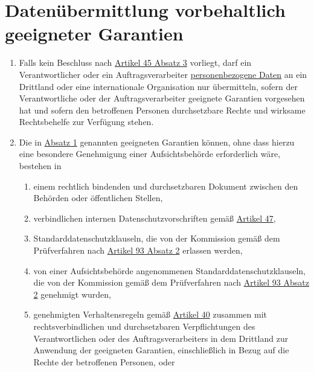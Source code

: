 \chapter{Datenübermittlung vorbehaltlich geeigneter Garantien}
\label{ch:46}


\begin{enumerate}

  \item Falls kein Beschluss nach \hyperref[itm:45-3]{Artikel 45 Absatz 3} vorliegt, darf ein Verantwortlicher oder ein
   Auftragsverarbeiter \hyperref[itm:04-1]{personenbezogene Daten} an ein Drittland oder eine internationale Organisation nur übermitteln,
   sofern der Verantwortliche oder der Auftragsverarbeiter geeignete Garantien vorgesehen hat und sofern den
   betroffenen Personen durchsetzbare Rechte und wirksame Rechtsbehelfe zur Verfügung stehen.
  \label{itm:46-1}

  \item Die in \hyperref[itm:46-1]{Absatz 1} genannten geeigneten Garantien können, ohne dass hierzu eine besondere
   Genehmigung einer Aufsichtsbehörde erforderlich wäre, bestehen in
  \label{itm:46-2}

  \begin{enumerate}
  
    \item einem rechtlich bindenden und durchsetzbaren Dokument zwischen den Behörden oder öffentlichen Stellen,
    \label{itm:46-2a}

    \item verbindlichen internen Datenschutzvorschriften gemäß \hyperref[ch:47]{Artikel 47},
    \label{itm:46-2b}

    \item Standarddatenschutzklauseln, die von der Kommission gemäß dem Prüfverfahren nach \hyperref[itm:93-2]
     {Artikel 93 Absatz 2} erlassen werden,
    \label{itm:46-2c}

    \item von einer Aufsichtsbehörde angenommenen Standarddatenschutzklauseln, die von der Kommission gemäß dem
     Prüfverfahren nach \hyperref[itm:93-2]{Artikel 93 Absatz 2} genehmigt wurden,
    \label{itm:46-2d}

    \item genehmigten Verhaltensregeln gemäß \hyperref[ch:40]{Artikel 40} zusammen mit rechtsverbindlichen und
     durchsetzbaren Verpflichtungen des Verantwortlichen oder des Auftragsverarbeiters in dem Drittland zur Anwendung
     der geeigneten Garantien, einschließlich in Bezug auf die Rechte der betroffenen Personen, oder
    \label{itm:46-2e}


\end{enumerate}
\end{enumerate}
